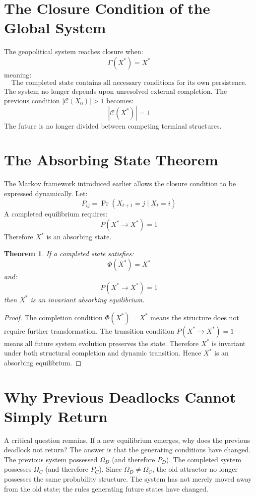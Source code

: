 \documentclass[11pt,openany]{book}
\theoremstyle{plain}
\newtheorem{theorem}{Theorem}[chapter]
\theoremstyle{definition}
\begin{document}
\section{The Closure Condition of the Global System}

The geopolitical system reaches closure when:
\[
\Gamma(X^*) = X^*
\]
meaning:
\[
\boxed{
\text{The completed state contains all necessary conditions for its own persistence.}
}
\]
The system no longer depends upon unresolved external completion. The previous condition \(|\mathcal{C}(X_0)| > 1\) becomes:
\[
|\mathcal{C}(X^*)| = 1
\]
The future is no longer divided between competing terminal structures.

\section{The Absorbing State Theorem}

The Markov framework introduced earlier allows the closure condition to be expressed dynamically. Let:
\[
P_{ij} = \Pr(X_{t+1} = j \mid X_t = i)
\]
A completed equilibrium requires:
\[
P(X^* \to X^*) = 1
\]
Therefore \(X^*\) is an absorbing state.

\begin{theorem}
If a completed state satisfies:
\[
\Phi(X^*) = X^*
\]
and:
\[
P(X^* \to X^*) = 1
\]
then \(X^*\) is an invariant absorbing equilibrium.
\end{theorem}

\begin{proof}
The completion condition \(\Phi(X^*) = X^*\) means the structure does not require further transformation. The transition condition \(P(X^* \to X^*) = 1\) means all future system evolution preserves the state. Therefore \(X^*\) is invariant under both structural completion and dynamic transition. Hence \(X^*\) is an absorbing equilibrium.
\end{proof}

\section{Why Previous Deadlocks Cannot Simply Return}

A critical question remains. If a new equilibrium emerges, why does the previous deadlock not return? The answer is that the generating conditions have changed. The previous system possessed \(\Omega_D\) (and therefore \(P_D\)). The completed system possesses \(\Omega_C\) (and therefore \(P_C\)). Since \(\Omega_D \neq \Omega_C\), the old attractor no longer possesses the same probability structure. The system has not merely moved away from the old state; the rules generating future states have changed.
\end{document}

